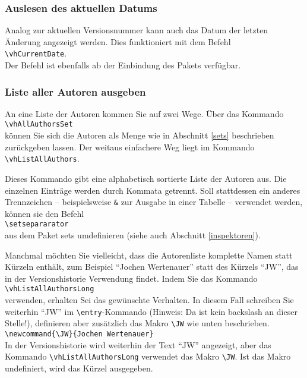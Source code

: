 \subsubsection{Auslesen des aktuellen Datums}
Analog zur aktuellen Versionsnummer kann auch das Datum der letzten Änderung angezeigt werden. Dies funktioniert mit dem Befehl\\
\mbox{}\hspace{2em}\verb|\vhCurrentDate|.\\
Der Befehl ist ebenfalls ab der Einbindung des Pakets verfügbar.

\subsubsection{Liste aller Autoren ausgeben}
An eine Liste der Autoren kommen Sie auf zwei Wege. Über das Kommando\\
\mbox{}\hspace{2em}\verb|\vhAllAuthorsSet|\\
können Sie sich die Autoren als Menge wie in Abschnitt \ref{sets} beschrieben zurückgeben lassen. Der weitaus einfachere Weg liegt im Kommando\\
\mbox{}\hspace{2em}\verb|\vhListAllAuthors|.

Dieses Kommando gibt eine alphabetisch sortierte Liste der Autoren aus. Die einzelnen Einträge werden durch Kommata getrennt. Soll stattdessen ein anderes Trennzeichen -- beispielsweise \texttt{\&} zur Ausgabe in einer Tabelle -- verwendet werden, können sie den Befehl\\
\mbox{}\hspace{2em}\verb|\setsepararator|\\
aus dem Paket sets umdefinieren (siehe auch Abschnitt \ref{inspektoren}).

Manchmal möchten Sie vielleicht, dass die Autorenliste komplette Namen statt Kürzeln enthält, zum Beispiel
"`Jochen Wer\-ten\-au\-er"' statt des Kürzels "`JW"', das in der Versionshistorie Verwendung findet. Indem Sie das Kommando\\
\mbox{}\hspace{2em}\verb|\vhListAllAuthorsLong|\\
verwenden, erhalten Sei das gewünschte Verhalten. In diesem Fall schreiben Sie weiterhin ``JW'' im \verb|\entry|-Kommando (Hinweis: Da ist kein backslash an dieser Stelle!), definieren aber zusätzlich das Makro \verb|\JW| wie unten beschrieben.\\
\mbox{}\hspace{2em}\verb|\newcommand{\JW}{Jochen Wertenauer}|\\
In der Versionshistorie wird weiterhin der Text "`JW"' angezeigt, aber das Kommando \verb|\vhListAllAuthorsLong| verwendet das Makro \verb|\JW|. Ist das Makro undefiniert, wird das Kürzel ausgegeben.

